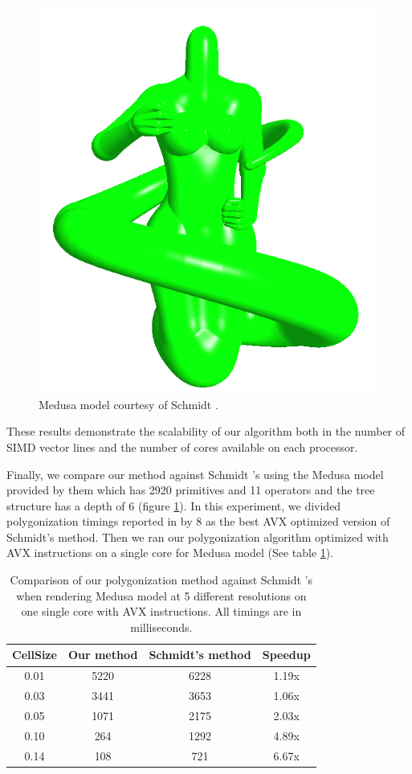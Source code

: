 \begin{figure}[htb]
  \centering
  \includegraphics[width=0.7\linewidth]{figures/cpupoly/medusa}
  \caption{\label{fig:ModelMedusa}
  {Medusa model courtesy of Schmidt \etal \cite{SWG2005}.}
}
\end{figure}

These results demonstrate the scalability of our algorithm both in the number of SIMD vector lines and 
the number of cores available on each processor. 

Finally, we compare our method against Schmidt \etal's \cite{SWG2005} using the Medusa model provided by them   
which has 2920 primitives and 11 operators and the tree structure has a depth of 6 (figure \ref{fig:ModelMedusa}).
In this experiment, we divided polygonization timings reported in \cite{SWG2005} by 8 as the best AVX
optimized version of Schmidt's method. Then we ran our polygonization algorithm
optimized with AVX instructions on a single core for Medusa model (See table \ref{table:stats}). 

\begin{table}[H]
\begin{center}
	 \caption{\label{table:stats}
  {Comparison of our polygonization method against Schmidt \etal's \cite{SWG2005} 
  when rendering Medusa model at 5 different resolutions on one single core with AVX instructions. 
  All timings are in milliseconds.}
}
  \begin{tabular}{ | c | c | c | c |}
    \hline    
    CellSize & Our method & Schmidt's method & Speedup \\ \hline \hline
    0.01 & 5220 & 6228 & 1.19x\\ \hline
    0.03 & 3441 & 3653 & 1.06x \\ \hline
    0.05 & 1071 & 2175 & 2.03x	 \\ \hline
    0.10 & 264 & 1292 &	4.89x \\ \hline    
    0.14 & 108 & 721 & 6.67x \\        
    \hline
  	\end{tabular}
\end{center}
\end{table}


